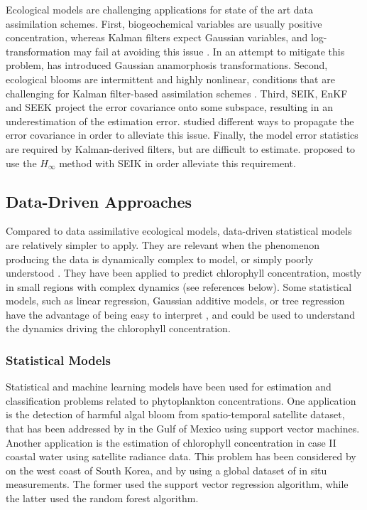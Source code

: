 Ecological models are challenging applications for state of the art data
assimilation schemes.  First, biogeochemical variables are usually positive
concentration, whereas Kalman filters expect Gaussian variables, and
log-transformation may fail at avoiding this issue \citep{Ciavatta2011}. In an
attempt to mitigate this problem, \citet{Fontana2013} has introduced Gaussian
anamorphosis transformations.  Second, ecological blooms are intermittent and
highly nonlinear, conditions that are challenging for Kalman filter-based
assimilation schemes \citep{Triantafyllou2012, Korres2012}. Third, SEIK, EnKF
and SEEK project the error covariance onto some subspace, resulting in an
underestimation of the estimation error. \citet{Butenschon2012} studied
different ways to propagate the error covariance in order to alleviate this
issue. Finally, the model error statistics are required by Kalman-derived
filters, but are difficult to estimate. \citet{Triantafyllou2012} proposed to
use the $H_\infty$ method with SEIK in order alleviate this requirement.

\subsection{Data-Driven Approaches}

Compared to data assimilative ecological models, data-driven statistical models
are relatively simpler to apply. They are relevant when the phenomenon
producing the data is dynamically complex to model, or simply poorly understood
\citep{Gareth2013}. They have been applied to predict chlorophyll
concentration, mostly in small regions with complex dynamics (see references
below). Some statistical models, such as linear regression, Gaussian additive
models, or tree regression have the advantage of being easy to interpret
\citep{Gareth2013}, and could be used to understand the dynamics driving the
chlorophyll concentration.

\subsubsection{Statistical Models}

Statistical and machine learning models have been used for estimation and
classification problems related to phytoplankton concentrations. One
application is the detection of harmful algal bloom from spatio-temporal
satellite dataset, that has been addressed by \citet{Gokaraju2011} in the Gulf
of Mexico using support vector machines. Another application is the estimation
of chlorophyll concentration in case II coastal water using satellite radiance
data. This problem has been considered by \citet{Kim2014} on the west coast of
South Korea, and by \citet{Camps-Valls2006} using a global dataset of in situ
measurements.  The former used the support vector regression algorithm, while
the latter used the random forest algorithm.

